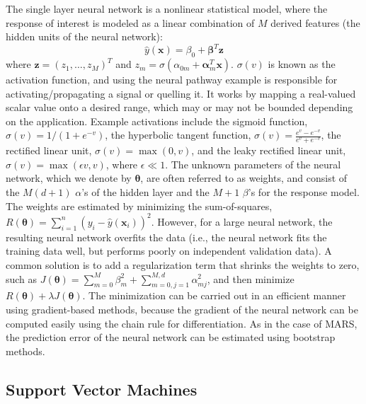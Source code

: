 The single layer neural network is a nonlinear statistical model, where the response of interest is modeled as a linear combination of $M$ derived features (the hidden units of the neural network):
%
\begin{equation}
\hat{y}(\mathbf{x}) = \beta_0 + \boldsymbol{\beta}^T \mathbf{z}
\end{equation}
%
where $\mathbf{z} = (z_1, \dots, z_M)^T$ and $z_m = \sigma(\alpha_{0m} + \boldsymbol{\alpha}_m^T \mathbf{x})$.
%
$\sigma(v)$ is known as the activation function, and using the neural pathway example is responsible for activating/propagating a signal or quelling it.
%
It works by mapping a real-valued scalar value onto a desired range, which may or may not be bounded depending on the application.
%
Example activations include the sigmoid function, $\sigma(v) = 1/(1+e^{-v})$, the hyperbolic tangent function, $\sigma(v) = \frac{e^v-e^{-v}}{e^v+e^{-v}}$, the rectified linear unit, $\sigma(v) = \max(0, v)$, and the leaky rectified linear unit, $\sigma(v) = \max(\epsilon v, v)$, where $\epsilon \ll 1$.
%
The unknown parameters of the neural network, which we denote by $\boldsymbol{\theta}$, are often referred to as weights, and consist of the $M(d+1)$ $\alpha$'s of the hidden layer and the $M+1$ $\beta$'s for the response model.
%
The weights are estimated by minimizing the sum-of-squares, $R(\boldsymbol{\theta}) = \sum_{i=1}^n (y_i - \hat{y}(\mathbf{x}_i))^2$.
%
However, for a large neural network, the resulting neural network overfits the data (i.e., the neural network fits the training data well, but performs poorly on independent validation data).
%
A common solution is to add a regularization term that shrinks the weights to zero, such as $J(\boldsymbol{\theta}) = \sum_{m=0}^M \beta_{m}^2 + \sum_{m=0,j=1}^{M,d} \alpha_{mj}^2$, and then minimize $R(\boldsymbol{\theta}) + \lambda J(\boldsymbol{\theta})$.
%
The minimization can be carried out in an efficient manner using gradient-based methods, because the gradient of the neural network can be computed easily using the chain rule for differentiation.
%
As in the case of MARS, the prediction error of the neural network can be estimated using bootstrap methods.

\subsection{Support Vector Machines}
\label{sec:svm}

